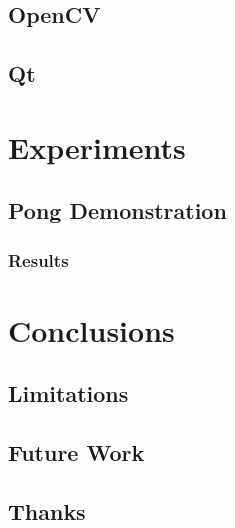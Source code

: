\documentclass{report}
\begin{document}
\section{OpenCV}
\section{Qt}


\chapter{Experiments} 
\section{Pong Demonstration}
\subsection{Results}

\chapter{Conclusions}
\section{Limitations}
\section{Future Work}

\section{Thanks}



\end{document}
